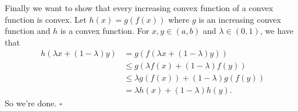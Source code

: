 \documentclass[11pt]{article}
\begin{document}
Finally we want to show that every increasing convex function of a convex function is convex. Let $h(x) = g(f(x))$ where $g$ is an increasing convex function and $h$ is a convex function. For $x,y \in (a,b)$ and $\lambda \in (0,1)$, we have that
\begin{align*}
h(\lambda x + (1-\lambda)y) &= g(f(\lambda x + (1-\lambda)y))\\
&\leq g(\lambda f(x) + (1-\lambda)f(y))\\
&\leq \lambda g(f(x)) + (1-\lambda)g(f(y))\\
&= \lambda h(x) + (1-\lambda)h(y).
\end{align*}
So we're done. \hfill $\square$
\end{document}
